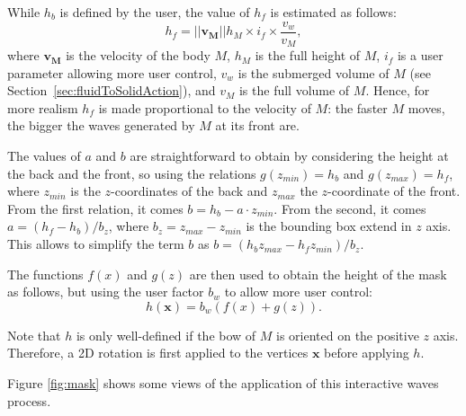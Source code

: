 \documentclass[final]{jcgt}
\begin{document}
While $h_b$ is defined by the user, the value of $h_f$ is estimated as follows:
\begin{equation}
	h_f = ||\mathbf{v_M}||h_{M}\times i_f\times\frac{v_w}{v_{M}},
\end{equation}
where $\mathbf{v_M}$ is the velocity of the body $M$, $h_M$ is the full height of $M$, $i_f$ is a user parameter allowing more user control, $v_w$ is the submerged volume of $M$ (see Section~\ref{sec:fluidToSolidAction}), and $v_{M}$ is the full volume of $M$.
Hence, for more realism $h_f$ is made proportional to the velocity of $M$:
the faster $M$ moves, the bigger the waves generated by $M$ at its front are.

The values of $a$ and $b$ are straightforward to obtain by considering the height at the back and the front, so using the relations $g(z_{min})=h_b$ and $g(z_{max})=h_f$,
where $z_{min}$ is the $z$-coordinates of the back and $z_{max}$ the $z$-coordinate of the front.
From the first relation, it comes $b=h_b-a\cdot z_{min}$.
From the second, it comes $a=\left(h_f-h_b\right)/b_z$, where $b_z=z_{max}-z_{min}$ is the bounding box extend in $z$ axis.
This allows to simplify the term $b$ as $b=\left(h_bz_{max}-h_fz_{min}\right)/b_z$.

The functions $f(x)$ and $g(z)$ are then used to obtain the height of the mask as follows,
but using the user factor $b_w$ to allow more user control:
\begin{equation}
	\label{equa:mask_full}
	h(\mathbf x)=b_w\left(f(x)+g(z)\right).
\end{equation}

Note that $h$ is only well-defined if the bow of $M$ is oriented on the positive $z$ axis.
Therefore, a 2D rotation is first applied to the vertices $\mathbf x$ before applying $h$.

Figure \ref{fig:mask} shows some views of the application of this interactive waves process.
\end{document}
